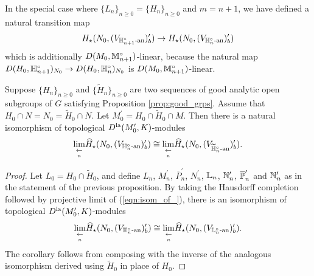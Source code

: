 \documentclass[10pt]{amsart}
\begin{document}

\begin{remark}
In the special case where $\{L_{n}\}_{n\geq 0}=\{H_{n}\}_{n\geq 0}$ and $m=n+1$, we have defined a natural transition map \[
    H_{\star}(N_{0},(V_{\h_{n+1}^{\circ}\An})^{\prime}_{b}) \ra H_{\star}(N_{0},(V_{\h_{n}^{\circ}\An})^{\prime}_{b})
\] which is additionally $D(M_{0},\m_{n+1}^{\circ})$-linear, because the natural map $D(H_{0},\h_{n+1}^{\circ})_{N_{0}}\ra D(H_{0},\h_{n}^{\circ})_{N_{0}}$ is $D(M_{0},\m_{n+1}^{\circ})$-linear. 
\end{remark}

\begin{corollary}\label{cor:same_inv_limit}
Suppose $\{H_{n}\}_{n\geq 0}$ and $\{\widetilde{H}_{n}\}_{n\geq 0}$ are two sequences of good analytic open subgroups of $G$ satisfying Proposition \ref{prop:good_grps}. Assume that $H_{0}\cap N = N_{0} = \widetilde{H}_{0}\cap N$. Let $M^{\prime}_{0}=H_{0}\cap \widetilde{H}_{0} \cap M$. Then there is a natural isomorphism of topological $D^{\La}(M^{\prime}_{0},K)$-modules \begin{equation}
    \underset{\underset{n}{\la}}{\lim}\widehat{H}_{\star}(N_{0},(V_{\h_{n}^{\circ}\An})^{\prime}_{b}) \cong \underset{\underset{n}{\la}}{\lim}\widehat{H}_{\star}(N_{0},(V_{\widetilde{\h}^{\circ}_{n}\An})^{\prime}_{b}).
\end{equation} 
\end{corollary}
\begin{proof}
Let $L_{0}= H_{0}\cap \widetilde{H}_{0}$, and define $L_{n}$, $M_{n}^{\prime}$, $\overline{P}_{n}^{\prime}$, $N_{n}^{\prime}$, $\L_{n}$, $\n_{n}^{\prime}$, $\overline{\P}_{n}^{\prime}$ and $\n^{\prime}_{n}$ as in the statement of the previous proposition. By taking the Hausdorff completion followed by projective limit of (\ref{eqn:isom_of_}), there is an isomorphism of topological $D^{\La}(M^{\prime}_{0},K)$-modules \begin{equation*}
    \underset{\underset{n}{\la}}{\lim}\widehat{H}_{\star}(N_{0},(V_{\h_{n}^{\circ}\An})^{\prime}_{b}) \cong \underset{\underset{n}{\la}}{\lim}\widehat{H}_{\star}(N_{0},(V_{\L^{\circ}_{n}\An})^{\prime}_{b}).
\end{equation*} The corollary follows from composing with the inverse of the analogous isomorphism derived using $\widetilde{H}_{0}$ in place of $H_{0}$. 
\end{proof}
\end{document}

